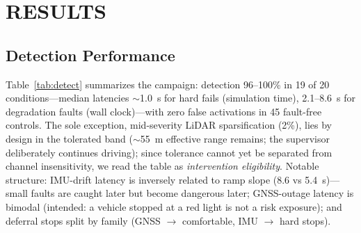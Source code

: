 \documentclass[letterpaper, 10pt, conference]{ieeeconf}
\begin{document}
\section{RESULTS}

\subsection{Detection Performance}
Table~\ref{tab:detect} summarizes the campaign: detection 96--100\% in
19 of 20 conditions---median latencies $\sim$1.0~s for hard fails
(simulation time), 2.1--8.6~s for degradation faults (wall clock)---with
zero false activations in 45 fault-free controls. The sole exception, mid-severity LiDAR sparsification (2\%), lies by
design in the tolerated band ($\sim$55~m effective range remains; the
supervisor deliberately continues driving); since tolerance cannot yet be
separated from channel insensitivity, we read the table as
\emph{intervention eligibility}. Notable structure: IMU-drift latency is inversely related to ramp slope
(8.6 vs 5.4~s)---small faults are caught later but become dangerous later;
GNSS-outage latency is bimodal (intended: a vehicle stopped at a red light
is not a risk exposure); and deferral stops split by family (GNSS
$\rightarrow$ comfortable, IMU $\rightarrow$ hard stops).
\end{document}
